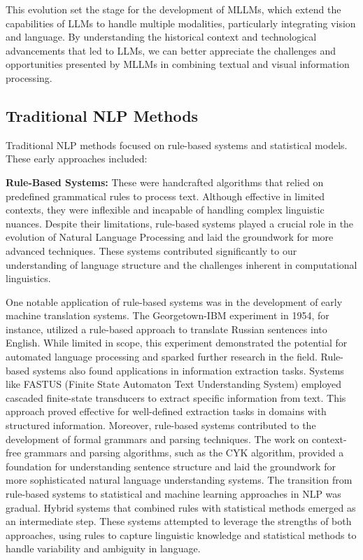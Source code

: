 This evolution set the stage for the development of MLLMs, which extend the capabilities of LLMs to handle multiple modalities, particularly integrating vision and language. By understanding the historical context and technological advancements that led to LLMs, we can better appreciate the challenges and opportunities presented by MLLMs in combining textual and visual information processing.

\subsection{Traditional NLP Methods}
Traditional NLP methods focused on rule-based systems and statistical models. These early approaches included:

\textbf{Rule-Based Systems:} These were handcrafted algorithms that relied on predefined grammatical rules to process text. Although effective in limited contexts, they were inflexible and incapable of handling complex linguistic nuances. Despite their limitations, rule-based systems played a crucial role in the evolution of Natural Language Processing and laid the groundwork for more advanced techniques. These systems contributed significantly to our understanding of language structure and the challenges inherent in computational linguistics.

One notable application of rule-based systems was in the development of early machine translation systems. The Georgetown-IBM experiment in 1954, for instance, utilized a rule-based approach to translate Russian sentences into English. While limited in scope, this experiment demonstrated the potential for automated language processing and sparked further research in the field. Rule-based systems also found applications in information extraction tasks. Systems like FASTUS (Finite State Automaton Text Understanding System) employed cascaded finite-state transducers to extract specific information from text. This approach proved effective for well-defined extraction tasks in domains with structured information. Moreover, rule-based systems contributed to the development of formal grammars and parsing techniques. The work on context-free grammars and parsing algorithms, such as the CYK algorithm, provided a foundation for understanding sentence structure and laid the groundwork for more sophisticated natural language understanding systems. The transition from rule-based systems to statistical and machine learning approaches in NLP was gradual. Hybrid systems that combined rules with statistical methods emerged as an intermediate step. These systems attempted to leverage the strengths of both approaches, using rules to capture linguistic knowledge and statistical methods to handle variability and ambiguity in language.

